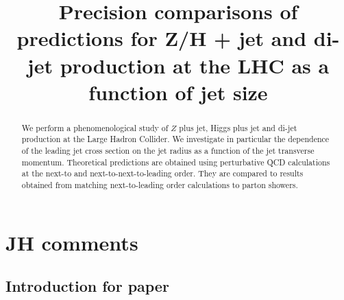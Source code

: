 \documentclass[aps,prd,onecolumn,fleqn,superscriptaddress,groupedaddress,nofootinbib,preprintnumbers,nobalancelastpage]{revtex4}
\begin{document}
\title{Precision comparisons of predictions for Z/H + jet
and di-jet production at the LHC as a function of jet size}

  
\begin{abstract}
  We perform a phenomenological study of
  $Z$ plus jet, Higgs plus jet and di-jet production
  at the Large Hadron Collider. We investigate in particular
  the dependence of the leading jet cross section on the
  jet radius as a function of the jet transverse momentum. 
  Theoretical predictions are obtained using perturbative QCD
  calculations at the next-to and next-to-next-to-leading order.
  They are compared to results obtained from matching 
  next-to-leading order calculations to parton showers.
\end{abstract}

\maketitle

\section{JH comments}



\subsection{Introduction for paper}
\end{document}
